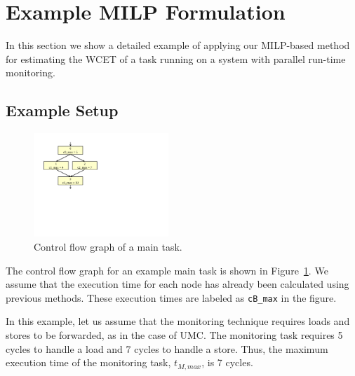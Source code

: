
\section{Example MILP Formulation}
\label{sec:monitoring_wcet.example}


In this section we show a detailed example of applying our MILP-based method
for estimating the WCET of a task running on a system with parallel run-time
monitoring.

\subsection{Example Setup}

\begin{figure}[htb]
  \begin{center}
    \vspace{-0.0in}
    \includegraphics[width=2.0in]{monitoring_wcet/figs/cfg.pdf}
    \vspace{-0.1in}
    \caption{Control flow graph of a main task.}
    \label{fig:app.cfg}
    \vspace{-0.2in}
  \end{center}
\end{figure}

The control flow graph for an example main task is shown in Figure~\ref{fig:app.cfg}. We assume
that the execution time for each node has already been calculated using
previous methods. These execution times are labeled as {\tt cB\_max} in the figure.

In this example, let us assume that the monitoring technique requires loads and stores 
to be forwarded, as
in the case of UMC. The monitoring task requires 5 cycles to handle a load and
7 cycles to handle a store. Thus, the maximum execution time of the monitoring
task, $t_{M, max}$, is 7 cycles.

